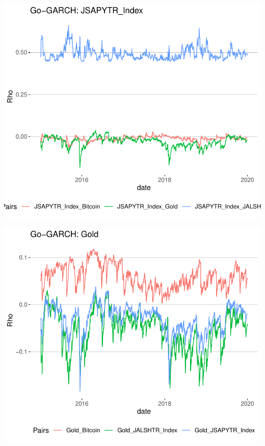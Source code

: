 \documentclass[11pt,preprint, authoryear]{elsarticle}
\numberwithin{equation}{section}
\numberwithin{figure}{section}
\numberwithin{table}{section}
\begin{document}
\includegraphics{FinMetrics-Essay_files/figure-latex/unnamed-chunk-15-1.pdf}

\includegraphics{FinMetrics-Essay_files/figure-latex/unnamed-chunk-16-1.pdf}
\end{document}
